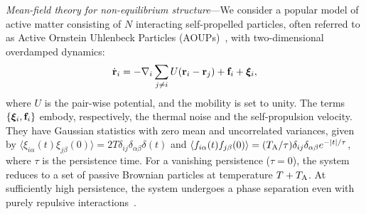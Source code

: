 \documentclass[superscriptaddress, twocolumn, prl, longbibliography, nofootinbib]{revtex4-1}
\begin{document}
{\it Mean-field theory for non-equilibrium structure}---We consider a popular model of active matter consisting of $N$ interacting self-propelled particles, often referred to as Active Ornstein Uhlenbeck Particles (AOUPs)~\cite{Szamel2014, Maggi2015, Nardini2016}, with two-dimensional overdamped dynamics:
 \begin{equation}
	\dot{\bf r}_i = -\nabla_i \sum_{j\neq i} U({\bf r}_i-{\bf r}_j) + {\bf f}_i + {\boldsymbol\xi}_i ,
\end{equation}
 where $U$ is the pair-wise potential, and the mobility is set to unity. The terms $\{{\boldsymbol\xi}_i,{\bf f}_i\}$ embody, respectively, the thermal noise and the self-propulsion velocity. They have Gaussian statistics with zero mean and uncorrelated variances, given by $\langle\xi_{i\alpha}(t)\xi_{j\beta}(0)\rangle = 2T \delta_{ij}\delta_{\alpha\beta}\delta(t)$ and $\langle f_{i\alpha}(t)f_{j\beta}(0)\rangle = (T_{\rm A}/\tau) \delta_{ij}\delta_{\alpha\beta}e^{-|t|/\tau}$, where $\tau$ is the persistence time. For a vanishing persistence ($\tau=0$), the system reduces to a set of passive Brownian particles at temperature $T+T_{\rm A}$. At sufficiently high persistence, the system undergoes a phase separation even with purely repulsive interactions~\cite{Nardini2016, Maggi2020}. 
\end{document}
